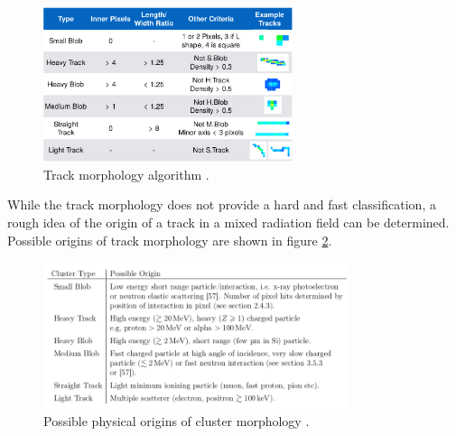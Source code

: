 \begin{figure}[H]
	\begin{center}
	\includegraphics[width=0.65\textwidth]{figures/stuartgraphic.pdf}
	\caption{Track morphology algorithm \cite{stuartalgo}.}
	\label{stuart_algo}
	\end{center}
\end{figure}

While the track morphology does not provide a hard and fast classification, a rough idea of the origin of a track in a mixed radiation field can be determined. Possible origins of track morphology are shown in figure \ref{track_morphology}.

\begin{figure}[H]
	\begin{center}
	\includegraphics[width=0.8\textwidth]{figures/cluster_types.png}
	\caption{Possible physical origins of cluster morphology \cite{stuartthesis}.}
	\label{track_morphology}
	\end{center}
\end{figure}
